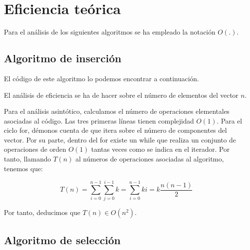 \documentclass{homework}
\begin{document}
    \section{Eficiencia teórica}

    Para el análisis de los siguientes algoritmos se ha empleado la notación $O(.)$. 

    \subsection{Algoritmo de inserción}

    El código de este algoritmo lo podemos encontrar a continuación.

    
    
    El análisis de eficiencia se ha de hacer sobre el número de elementos del vector $n$. 

    Para el análisis asintótico, calculamos el número de operaciones elementales asociadas al código. 
    Las tres primeras líneas tienen complejidad $O(1)$. Para el ciclo for, démonos cuenta de que itera sobre el número de
    componentes del vector. Por su parte, dentro del for existe un while que realiza un conjunto de operaciones de orden
    $O(1)$ tantas veces como se indica en el iterador. Por tanto, llamando $T(n)$ al números de operaciones asociadas
    al algoritmo, tenemos que:

    \begin{equation*}
        T(n) = \sum_{i=0}^{n-1} \sum_{j=0}^{i-1} k = \sum_{i=0}^{n-1} ki = k \frac{n(n-1)}{2} 
    \end{equation*}

    Por tanto, deducimos que $T(n) \in O(n^2)$. 

    \subsection{Algoritmo de selección}

        
\end{document}
